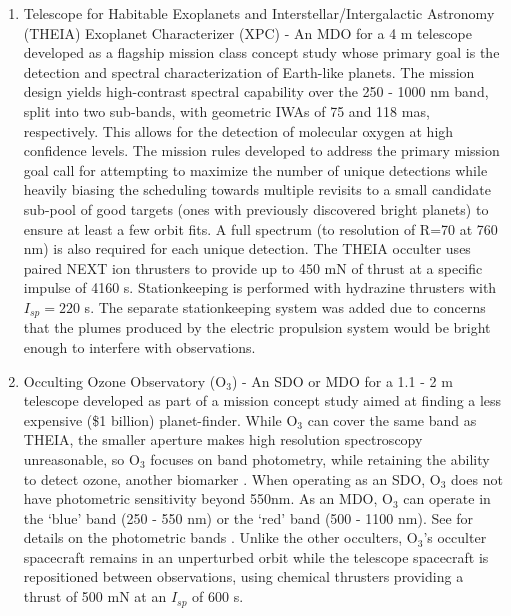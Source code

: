 \begin{enumerate}
\item Telescope for Habitable Exoplanets and Interstellar/Intergalactic Astronomy (THEIA) Exoplanet Characterizer (XPC) \citep{spergel2009} - An MDO for a  4 m telescope developed as a flagship mission class concept study whose primary goal is the detection and spectral characterization of Earth-like planets.  The mission design yields high-contrast spectral capability over the 250 - 1000 nm band, split into two sub-bands, with geometric IWAs of 75 and 118 mas, respectively.  This allows for the detection of molecular oxygen at high confidence levels.  The mission rules developed to address the primary mission goal call for attempting to maximize the number of unique detections while heavily biasing the scheduling towards multiple revisits to a small candidate sub-pool of good targets (ones with previously discovered bright planets) to ensure at least a few orbit fits. A full spectrum (to resolution of R=70 at 760 nm) is also required for each unique detection.  The THEIA occulter uses paired NEXT ion thrusters \citep{patterson2002next} to provide up to 450 mN of thrust at a specific impulse of 4160 s.  Stationkeeping is performed with hydrazine thrusters with $I_{sp} = 220$ s.  The separate stationkeeping system was added due to concerns that the plumes produced by the electric propulsion system would be bright enough to interfere with observations.
\item Occulting Ozone Observatory (O$_3$) - An SDO or MDO for a 1.1 - 2 m telescope developed as part of a mission concept study aimed at finding a less expensive (\midtilde\$1 billion) planet-finder.  While O$_3$ can cover the same band as THEIA, the smaller aperture makes high resolution spectroscopy unreasonable, so O$_3$ focuses on band photometry, while retaining the ability to detect ozone, another biomarker \citep{heap2010detecting}.  When operating as an SDO, O$_3$ does not have photometric sensitivity beyond 550nm.  As an MDO, O$_3$ can operate in the `blue' band (250 - 550 nm) or the `red' band (500 - 1100 nm).  See  for details on the photometric bands \citep{savransky2010occulting}.  Unlike the other occulters, O$_3$'s occulter spacecraft remains in an unperturbed orbit while the telescope spacecraft is repositioned between observations, using chemical thrusters providing a thrust of 500 mN at an $I_{sp}$ of 600 s.
\end{enumerate} 

